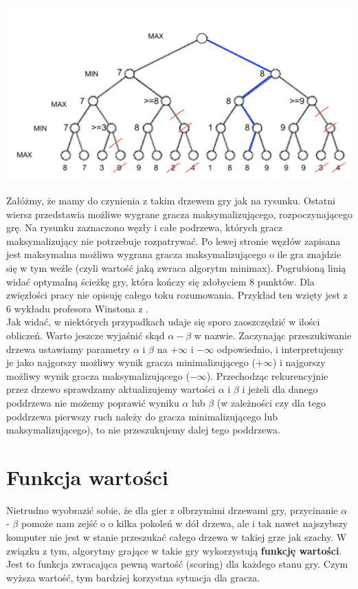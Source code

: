 \documentclass[licencjacka]{pracamgr}
\begin{document}
\begin{flushleft}
	\includegraphics [scale=0.45] {big_tree2.png}
\end{flushleft}
Załóżmy, że mamy do czynienia z takim drzewem gry jak na rysunku. Ostatni wiersz przedstawia możliwe wygrane gracza maksymalizującego, rozpoczynającego grę. Na rysunku zaznaczono węzły i całe podrzewa, których gracz maksymalizujący nie potrzebuje rozpatrywać. Po lewej stronie węzłów zapisana jest maksymalna możliwa wygrana gracza maksymalizującego o ile gra znajdzie się w tym weźle (czyli wartość jaką zwraca algorytm minimax). Pogrubioną linią widać optymalną ścieżkę gry, która kończy się zdobyciem 8 punktów. Dla zwięzłości pracy nie opisuję całego toku rozumowania. Przykład ten wzięty jest z 6 wykładu profesora Winstona z \cite{MIT_AI}.\\

Jak widać, w niektórych przypadkach udaje się sporo zaoszczędzić w ilości obliczeń.  Warto jeszcze wyjaśnić skąd $\alpha - \beta$ w nazwie. Zaczynając przeszukiwanie drzewa ustawiamy parametry $\alpha$ i $\beta$ na $+\infty$ i $-\infty$ odpowiednio, i interpretujemy je jako najgorszy możliwy wynik gracza minimalizującego ($+\infty$) i  najgorszy możliwy wynik gracza maksymalizującego ($-\infty$). Przechodząc rekurencyjnie przez drzewo sprawdzamy aktualizujemy wartości $\alpha$ i $\beta$ i jeżeli dla danego poddrzewa  nie możemy poprawić wyniku  $\alpha$ lub  $\beta$ (w zależności czy dla tego poddrzewa pierwszy ruch należy do gracza minimalizującego lub maksymalizującego), to nie przeszukujemy dalej tego poddrzewa.


\section{Funkcja wartości}
Nietrudno wyobrazić sobie, że dla gier z olbrzymimi drzewami gry, przycinanie $\alpha$ - $\beta$ pomoże nam zejść o o kilka pokoleń w dół drzewa, ale i tak nawet najszybszy komputer nie jest w stanie przeszukać całego drzewa w takiej grze jak szachy. W związku z tym,  algorytmy grające w takie gry wykorzystują \textbf{funkcję wartości}. Jest to funkcja zwracająca pewną wartość (scoring) dla każdego stanu gry. Czym wyższa wartość, tym bardziej korzystna sytuacja dla gracza. \\
\end{document}
